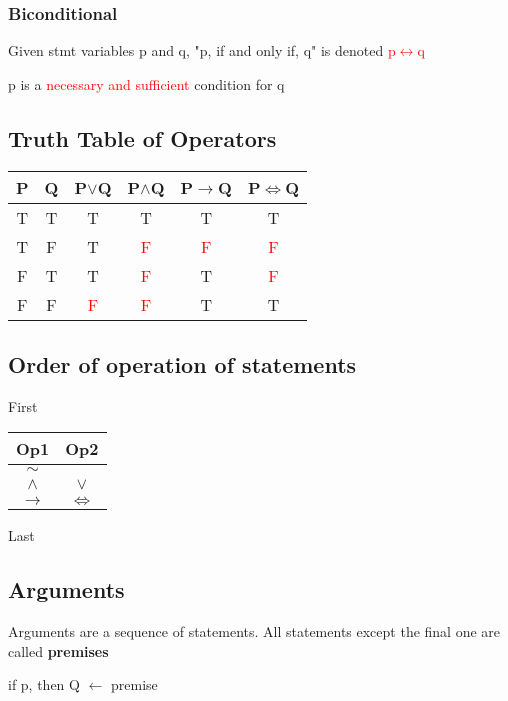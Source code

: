 \documentclass{article}
\begin{document}
\subsubsection{Biconditional}
Given stmt variables p and q, "p, if and only if, q" is denoted \textcolor{red}{p$\leftrightarrow$q}

p is a \textcolor{red}{necessary and sufficient} condition for q

\subsection{Truth Table of Operators}
\begin{tabular}{|c|c|c|c|c|c|}
    \hline
    P & Q & P$\vee$Q & P$\wedge$Q & P$\rightarrow$Q & P$\Leftrightarrow$Q \\
    \hline
    T & T & T & T & T & T  \\
    T & F & T & \textcolor{red}{F} & \textcolor{red}{F} & \textcolor{red}{F}  \\
    F & T & T & \textcolor{red}{F} & T & \textcolor{red}{F}  \\
    F & F & \textcolor{red}{F} & \textcolor{red}{F} & T & T  \\
    \hline
\end{tabular}


\subsection{Order of operation of statements}
First

\begin{tabular}{|c|c|}
    \hline
    Op1 & Op2 \\
    \hline
    \textbf{$\sim$} &  \\
    $\wedge$  & $\vee$  \\
    $\to$ & $\iff$  \\
    \hline
\end{tabular}

Last

\subsection{Arguments}
Arguments are a sequence of statements. All statements except the final one are called \textbf{premises}

\vspace{10pt}

if p, then Q \quad\quad $\leftarrow$  premise
\end{document}
